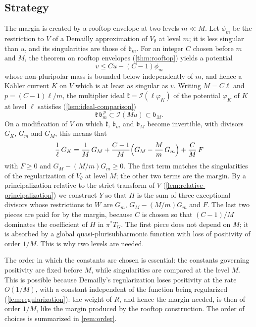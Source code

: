 \documentclass[11pt,a4paper]{amsart}
\theoremstyle{definition}
\begin{document}
\subsection*{Strategy}
The margin is created by a rooftop envelope at two levels $m\ll M$. Let
$\phi_m$ be the restriction to $V$ of a Demailly approximation of
$V_\theta$ at level $m$; it is less singular than $u$, and its
singularities are those of $\mathfrak b_m$. For an integer $C$ chosen
before $m$ and $M$, the theorem on rooftop envelopes
(\cref{thm:rooftop}) yields a potential
\[
  v\le Cu-(C-1)\phi_m
\]
whose non-pluripolar mass is bounded below independently of $m$, and
hence a K\"ahler current $K$ on $V$ which is at least as singular as $v$.
Writing $M=C\ell$ and $p=(C-1)\ell/m$, the multiplier ideal
$\mathfrak k=\mathcal I(\ell\varphi_K)$ of the potential
$\varphi_K$ of $K$ at level $\ell$ satisfies
(\cref{lem:ideal-comparison})
\[
  \mathfrak k\,\mathfrak b_m^{\,p}\subset\mathcal I(Mu)\subset\mathfrak b_M .
\]
On a modification of $V$ on which $\mathfrak k$, $\mathfrak b_m$ and
$\mathfrak b_M$ become invertible, with divisors $G_K$, $G_m$ and $G_M$,
this means that
\[
  \frac1\ell\,G_K=\frac1M\,G_M+\frac{C-1}M\Bigl(G_M-\frac Mm\,G_m\Bigr)
  +\frac CM\,F
\]
with $F\ge0$ and $G_M-(M/m)G_m\ge0$. The first term matches the
singularities of the regularization of $V_\theta$ at level $M$; the other
two terms are the margin. By a principalization relative to the strict
transform of $V$ (\cref{lem:relative-principalization}) we construct $Y$
so that $H$ is the sum of three exceptional divisors whose restrictions
to $W$ are $G_m$, $G_M-(M/m)G_m$ and $F$. The last two pieces are paid
for by the margin, because $C$ is chosen so that $(C-1)/M$ dominates the
coefficient of $H$ in $\pi^*T_G$. The first piece does not depend on $M$; it is absorbed
by a global quasi-plurisubharmonic function with loss of positivity of
order $1/M$. This is why two levels are needed.

The order in which the constants are chosen is essential: the constants
governing positivity are fixed before $M$, while singularities are
compared at the level $M$. This is possible because Demailly's
regularization loses positivity at the rate $O(1/M)$, with a constant
independent of the function being regularized
(\cref{lem:regularization}): the weight of $R$, and hence the margin
needed, is then of order $1/M$, like the margin produced by the rooftop
construction. The order of choices is summarized in
\cref{rem:order}.
\end{document}
